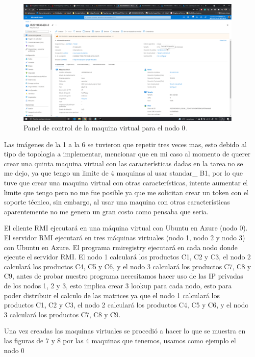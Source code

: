 \documentclass[11pt]{article}
\begin{document}
		\begin{figure}[H]
			\centering
			\includegraphics[scale=0.34]{resources/Panelcontrol.png}
			\caption{Panel de control de la maquina virtual para el nodo 0. }\label{fig:picture}
		\end{figure}
Las imágenes de la 1 a la 6 se tuvieron que repetir tres veces mas, esto debido al tipo de topologia a implementar, mencionar que en mi caso al momento de querer crear una quinta maquina virtual con las características dadas en la tarea no se me dejo, ya que tengo un limite de 4 maquinas al usar standar\_ B1, por lo que tuve que crear una maquina virtual con otras características, intente aumentar el limite que tengo pero no me fue posible ya que me solicitan crear un token con el soporte técnico, sin embargo, al usar una maquina con otras características aparentemente no me genero un gran costo como pensaba que seria.\par
El cliente RMI ejecutará en una máquina virtual con Ubuntu en Azure (nodo 0). El servidor RMI ejecutará en tres máquinas virtuales (nodo 1, nodo 2 y nodo 3) con Ubuntu en Azure. El programa rmiregistry ejecutará en cada nodo donde ejecute el servidor RMI. El nodo 1 calculará los productos C1, C2 y C3, el nodo 2 calculará los productos C4, C5 y C6, y el nodo 3 calculará los productos C7, C8 y C9, antes de probar nuestro programa necesitamos hacer uso de las IP privadas de los nodos 1, 2 y 3, esto implica crear 3 lookup para cada nodo, esto para poder distribuir el calculo de las matrices ya que el nodo 1 calculará los productos C1, C2 y C3, el nodo 2 calculará los productos C4, C5 y C6, y el nodo 3 calculará los productos C7, C8 y C9.\par
Una vez creadas las maquinas virtuales se procedió a hacer lo que se muestra en las figuras de 7 y 8 por las 4 maquinas que tenemos, usamos como ejemplo el nodo 0
\end{document}
